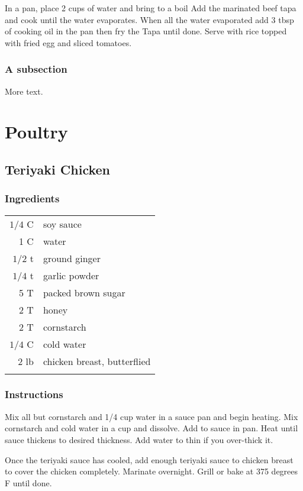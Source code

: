 \documentclass[12pt,landscape,twoside,twocolumn, openright, titlepage, draft]{book}
\begin{document}
In a pan, place 2 cups of water and bring to a boil
Add the marinated beef tapa and cook until the water evaporates.
When all the water evaporated add 3 tbsp of cooking oil in the pan then fry the Tapa until done.
Serve with rice topped with fried egg and sliced tomatoes.




\subsection{A subsection}

More text.

\chapter{Poultry}


\section{Teriyaki Chicken}

\subsection{Ingredients}
\begin{tabular}{r p{1.5in}}
  $1/4$ C & soy sauce \\
  1 C     & water \\
  $1/2$ t & ground ginger \\
  $1/4$ t & garlic powder \\
  5 T     & packed brown sugar \\
  2 T     & honey \\
  2 T     & cornstarch \\
  $1/4$ C & cold water \\
  $2$ lb  & chicken breast, butterflied \\ \\
\end{tabular}

\subsection{Instructions}

Mix all but cornstarch and 1/4 cup water in a sauce pan and begin
heating. Mix cornstarch and cold water in a cup and dissolve. Add to
sauce in pan. Heat until sauce thickens to desired thickness. Add
water to thin if you over-thick it.

Once the teriyaki sauce has cooled, add enough teriyaki sauce to
chicken breast to cover the chicken completely. Marinate overnight.
Grill or bake at 375 degrees F until done.
\end{document}
